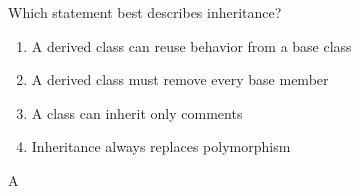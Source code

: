 
\item Which statement best describes inheritance?
\begin{enumerate}[label=\Alph*.]
\item A derived class can reuse behavior from a base class
\item A derived class must remove every base member
\item A class can inherit only comments
\item Inheritance always replaces polymorphism
\end{enumerate}

\begin{solution}
    A
\end{solution}
